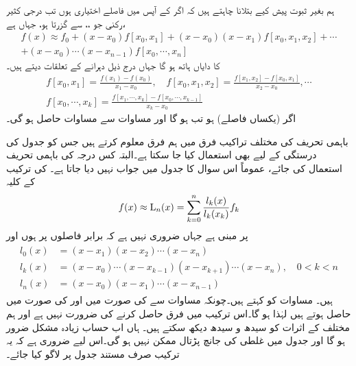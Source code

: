 ہم بغیر ثبوت پیش کیے بتلانا چاہتے ہیں کہ اگر  کے آپس میں فاصلے اختیاری ہوں تب  درجی کثیر رکنی جو ،، سے گزرتا ہو، جہاں  ہے،   
\begin{multline}\label{مساوات_اعدادی_نیوٹن_منقسم_فرق_الف}
f(x)\approx f_0+(x-x_0)f[x_0,x_1]+(x-x_0)(x-x_1)f[x_0,x_1,x_2]+\cdots\\
+(x-x_0)\cdots (x-x_{n-1})f[x_0,\cdots,x_n]
\end{multline}
 کا دایاں ہاتھ ہو گا جہاں   درج ذیل  دہرانے کے تعلقات دیتے ہیں۔
\begin{multline}\label{مساوات_اعدادی_نیوٹن_منقسم_فرق_ب}
f[x_0,x_1]=\frac{f(x_1)-f(x_0)}{x_1-x_0},\quad f[x_0,x_1,x_2]=\frac{f[x_1,x_2]-f[x_0,x_1]}{x_2-x_0},\cdots\\
f[x_0,\cdots,x_k]=\frac{f[x_1,\cdots,x_k]-f[x_0,\cdots,x_{k-1}]}{x_k-x_0}
\end{multline}
اگر  (یکساں فاصلے) ہو تب  ہو گا اور  مساوات  سے  مساوات  حاصل ہو گی۔


باہمی تحریف کی مختلف تراکیب  فرق میں ہم فرق معلوم کرتے ہیں جس کو جدول کی درستگی کے لیے بھی استعمال کیا جا سکتا ہے۔البتہ کس درجہ کی باہمی تحریف استعمال کی جائے،  عموماً اس سوال کا جدول میں جواب نہیں دیا جاتا ہے۔ کی ترکیب  کے کلیہ
\begin{align}\label{مساوات_اعدادی_لیگرینج_الف}
f(x)\approx \operatorname{L}_n(x)=\sum\limits_{k=0}^{n}\frac{l_k(x)}{l_k(x_k)}f_k
\end{align}
پر مبنی ہے جہاں ضروری نہیں ہے کہ  برابر فاصلوں پر ہوں اور
\begin{gather}
\begin{aligned}\label{مساوات_اعدادی_لیگرینج_ب}
l_0(x)&=(x-x_1)(x-x_2)\cdots(x-x_n)\\
l_k(x)&=(x-x_0)\cdots(x-x_{k-1})(x-x_{k+1})\cdots(x-x_n),\quad 0<k<n\\
l_n(x)&=(x-x_0)(x-x_1)\cdots(x-x_{n-1})
\end{aligned}
\end{gather}
ہیں۔ مساوات  کو  کہتے ہیں۔چونکہ مساوات  سے  کی صورت میں   اور  کی صورت میں  حاصل ہوتے ہیں  لہٰذا  ہو گا۔اس ترکیب میں فرق حاصل کرنے کی ضرورت نہیں ہے اور ہم مختلف  کے اثرات کو سیدھ و سیدھ دیکھ سکتے ہیں۔ ہاں اب حساب زیادہ مشکل ضرور ہو گا اور جدول میں غلطی کی جانچ پڑتال ممکن نہیں ہو گی۔اس لیے ضروری ہے کہ یہ ترکیب صرف مستند جدول پر لاگو کیا جائے۔

